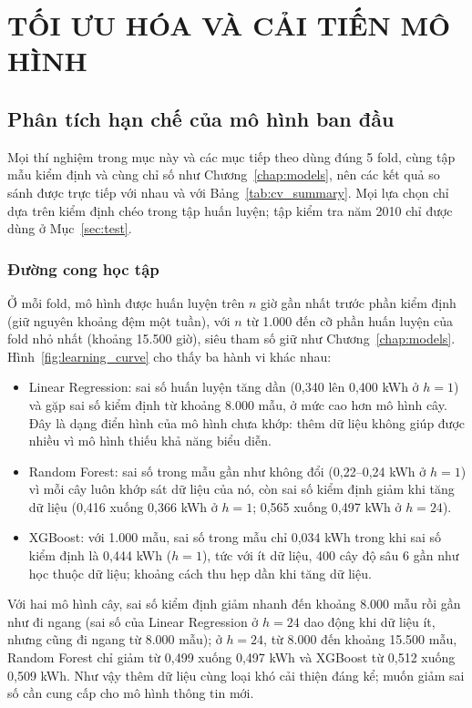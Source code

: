 \chapter{TỐI ƯU HÓA VÀ CẢI TIẾN MÔ HÌNH}
\label{chap:improve}

\section{Phân tích hạn chế của mô hình ban đầu}
\label{sec:limitations}

Mọi thí nghiệm trong mục này và các mục tiếp theo dùng đúng 5 fold, cùng tập mẫu kiểm định và cùng chỉ số như Chương~\ref{chap:models}, nên các kết quả so sánh được trực tiếp với nhau và với Bảng~\ref{tab:cv_summary}. Mọi lựa chọn chỉ dựa trên kiểm định chéo trong tập huấn luyện; tập kiểm tra năm 2010 chỉ được dùng ở Mục~\ref{sec:test}.

\subsection{Đường cong học tập}
Ở mỗi fold, mô hình được huấn luyện trên $n$ giờ gần nhất trước phần kiểm định (giữ nguyên khoảng đệm một tuần), với $n$ từ 1.000 đến cỡ phần huấn luyện của fold nhỏ nhất (khoảng 15.500 giờ), siêu tham số giữ như Chương~\ref{chap:models}. Hình~\ref{fig:learning_curve} cho thấy ba hành vi khác nhau:
\begin{itemize}
    \item Linear Regression: sai số huấn luyện tăng dần (0,340 lên 0,400 kWh ở $h = 1$) và gặp sai số kiểm định từ khoảng 8.000 mẫu, ở mức cao hơn mô hình cây. Đây là dạng điển hình của mô hình chưa khớp: thêm dữ liệu không giúp được nhiều vì mô hình thiếu khả năng biểu diễn.
    \item Random Forest: sai số trong mẫu gần như không đổi (0,22--0,24 kWh ở $h = 1$) vì mỗi cây luôn khớp sát dữ liệu của nó, còn sai số kiểm định giảm khi tăng dữ liệu (0,416 xuống 0,366 kWh ở $h = 1$; 0,565 xuống 0,497 kWh ở $h = 24$).
    \item XGBoost: với 1.000 mẫu, sai số trong mẫu chỉ 0,034 kWh trong khi sai số kiểm định là 0,444 kWh ($h = 1$), tức với ít dữ liệu, 400 cây độ sâu 6 gần như học thuộc dữ liệu; khoảng cách thu hẹp dần khi tăng dữ liệu.
\end{itemize}
Với hai mô hình cây, sai số kiểm định giảm nhanh đến khoảng 8.000 mẫu rồi gần như đi ngang (sai số của Linear Regression ở $h = 24$ dao động khi dữ liệu ít, nhưng cũng đi ngang từ 8.000 mẫu); ở $h = 24$, từ 8.000 đến khoảng 15.500 mẫu, Random Forest chỉ giảm từ 0,499 xuống 0,497 kWh và XGBoost từ 0,512 xuống 0,509 kWh. Như vậy thêm dữ liệu cùng loại khó cải thiện đáng kể; muốn giảm sai số cần cung cấp cho mô hình thông tin mới.

